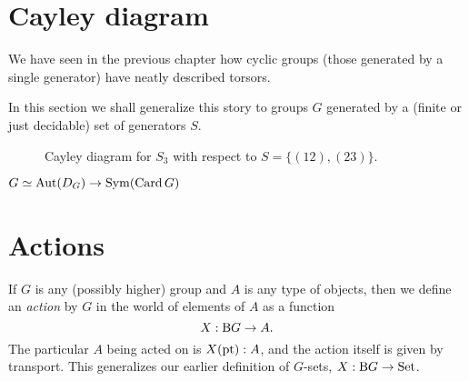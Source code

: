 \label{ch:symmetry}

\section{Cayley diagram}
\label{sec:cayley-diagram}

We have seen in the previous chapter how cyclic groups
(those generated by a single generator)
have neatly described torsors.

In this section we shall generalize this story
to groups $G$ generated by a
(finite or just decidable)
set of generators $S$.


\begin{figure}
  \centering
  \caption{Cayley diagram for $S_3$ with respect to $S = \{(12),(23)\}$.}
  \label{fig:cayley-s3}
\end{figure}

$G \simeq \operatorname{Aut}(D_G) \to \operatorname{Sym}(\operatorname{Card} G)$

\section{Actions}
\label{sec:actions}

If $G$ is any (possibly higher) group and $A$ is any type of objects,
then we define an \emph{action} by $G$ in the world of elements of $A$ as a function
\[
  X : \operatorname{B}\! G \to A.
\]
The particular $A$ being acted on is $X({\mathord{\mathrm{pt}}}):A$,
and the action itself is given by transport.
This generalizes our earlier definition of $G$-sets, $X : \operatorname{B}\! G \to \mathord{\mathrm{Set}}$.

